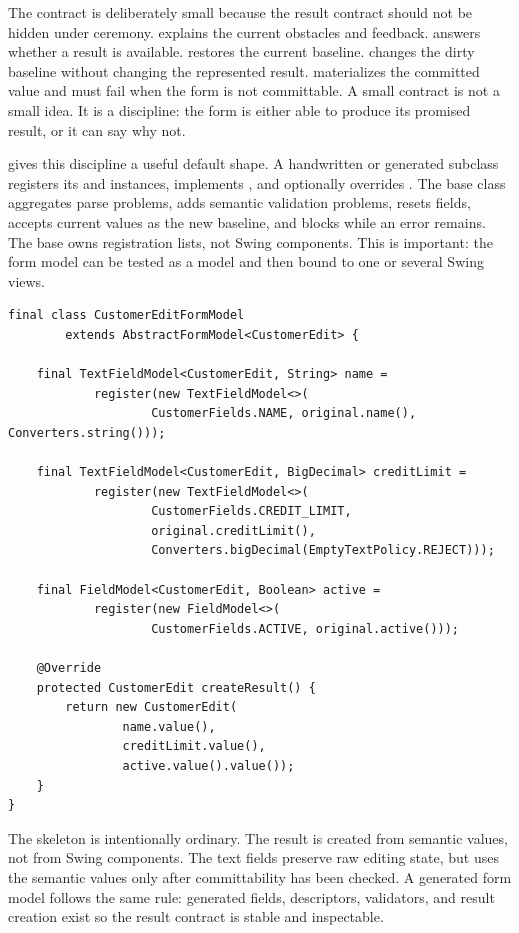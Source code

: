 The  contract is deliberately small because the result
contract should not be hidden under ceremony.  explains the
current obstacles and feedback.  answers whether a result is
available.  restores the current baseline. 
changes the dirty baseline without changing the represented result.
 materializes the committed value and must fail when the form is
not committable. A small contract is not a small idea. It is a discipline: the
form is either able to produce its promised result, or it can say why not.

 gives this discipline a useful default shape. A
handwritten or generated subclass registers its  and
 instances, implements , and optionally
overrides . The base class aggregates parse problems,
adds semantic validation problems, resets fields, accepts current values as the
new baseline, and blocks  while an error remains. The base owns
registration lists, not Swing components. This is important: the form model can
be tested as a model and then bound to one or several Swing views.

\begin{lstlisting}[caption={A result-first form model skeleton.}]
final class CustomerEditFormModel
        extends AbstractFormModel<CustomerEdit> {

    final TextFieldModel<CustomerEdit, String> name =
            register(new TextFieldModel<>(
                    CustomerFields.NAME, original.name(), Converters.string()));

    final TextFieldModel<CustomerEdit, BigDecimal> creditLimit =
            register(new TextFieldModel<>(
                    CustomerFields.CREDIT_LIMIT,
                    original.creditLimit(),
                    Converters.bigDecimal(EmptyTextPolicy.REJECT)));

    final FieldModel<CustomerEdit, Boolean> active =
            register(new FieldModel<>(
                    CustomerFields.ACTIVE, original.active()));

    @Override
    protected CustomerEdit createResult() {
        return new CustomerEdit(
                name.value(),
                creditLimit.value(),
                active.value().value());
    }
}
\end{lstlisting}

The skeleton is intentionally ordinary. The result is created from semantic
values, not from Swing components. The text fields preserve raw editing state,
but  uses the semantic values only after committability has
been checked. A generated form model follows the same rule: generated fields,
descriptors, validators, and result creation exist so the result contract is
stable and inspectable.


